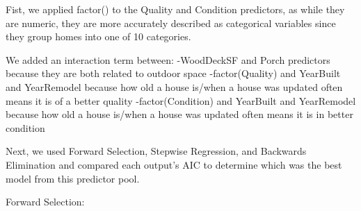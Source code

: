 \documentclass[
]{article}
\newenvironment{Shaded}{\begin{snugshade}}{\end{snugshade}}
\newcommand{\DataTypeTok}[1]{\textcolor[rgb]{0.13,0.29,0.53}{#1}}
\newcommand{\DecValTok}[1]{\textcolor[rgb]{0.00,0.00,0.81}{#1}}
\newcommand{\KeywordTok}[1]{\textcolor[rgb]{0.13,0.29,0.53}{\textbf{#1}}}
\newcommand{\NormalTok}[1]{#1}
\newcommand{\OperatorTok}[1]{\textcolor[rgb]{0.81,0.36,0.00}{\textbf{#1}}}
\newcommand{\OtherTok}[1]{\textcolor[rgb]{0.56,0.35,0.01}{#1}}
\newcommand{\StringTok}[1]{\textcolor[rgb]{0.31,0.60,0.02}{#1}}
\begin{document}
Fist, we applied factor() to the Quality and Condition predictors, as
while they are numeric, they are more accurately described as
categorical variables since they group homes into one of 10 categories.

We added an interaction term between: -WoodDeckSF and Porch predictors
because they are both related to outdoor space -factor(Quality) and
YearBuilt and YearRemodel because how old a house is/when a house was
updated often means it is of a better quality -factor(Condition) and
YearBuilt and YearRemodel because how old a house is/when a house was
updated often means it is in better condition

Next, we used Forward Selection, Stepwise Regression, and Backwards
Elimination and compared each output's AIC to determine which was the
best model from this predictor pool.

Forward Selection:

\begin{Shaded}
\end{Shaded}
\end{document}
